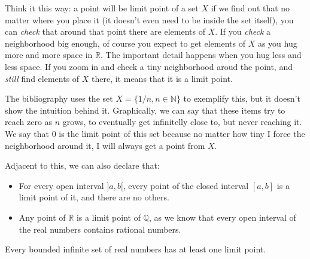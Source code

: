 Think it this way: a point will be limit point of a set $X$ if we find out that no matter where you place it (it doesn't even need to be inside the set itself), you can \textit{check} that around that point there are elements of $X$. If you \textit{check} a neighborhood big enough, of course you expect to get elements of $X$ as you hug more and more space in $\mathbb{R}$. The important detail happens when you hug less and less space. If you zoom in and check a tiny neighborhood aroud the point, and \textit{still} find elements of $X$ there, it means that it is a limit point.

The bibliography uses the set $X = \{1/n, n \in \mathbb{N}\}$ to exemplify this, but it doesn't show the intuition behind it. Graphically, we can say that these items try to reach zero as $n$ grows, to eventually get infinitelly close to, but never reaching it. We say that $0$ is the limit point of this set because no matter how tiny I force the neighborhood around it, I will always get a point from $X$.



Adjacent to this, we can also declare that:
\begin{itemize}
\item For every open interval $]a, b[$, every point of the closed interval $[a, b]$ is a limit point of it, and there are no others.
\item Any point of $\mathbb{R}$ is a limit point of $\mathbb{Q}$, as we know that every open interval of the real numbers contains rational numbers.
\end{itemize}

\begin{lemma}
Every bounded infinite set of real numbers has at least one limit point.
\end{lemma}

